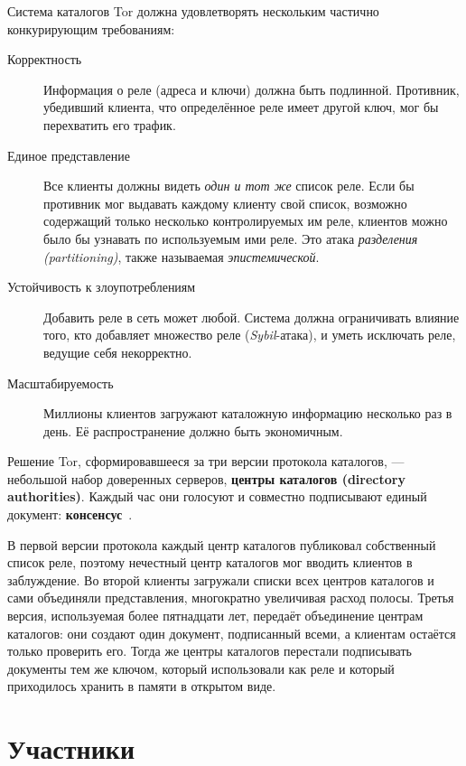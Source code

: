 Система каталогов Tor должна удовлетворять нескольким частично конкурирующим требованиям:
\begin{description}
  \item[Корректность] Информация о реле (адреса и ключи) должна быть подлинной. Противник, убедивший клиента, что определённое реле имеет другой ключ, мог бы перехватить его трафик.
  \item[Единое представление] Все клиенты должны видеть \emph{один и тот же} список реле. Если бы противник мог выдавать каждому клиенту свой список, возможно содержащий только несколько контролируемых им реле, клиентов можно было бы узнавать по используемым ими реле. Это атака \emph{разделения (partitioning)}, также называемая \emph{эпистемической}.
  \item[Устойчивость к злоупотреблениям] Добавить реле в сеть может любой. Система должна ограничивать влияние того, кто добавляет множество реле (\emph{Sybil}-атака), и уметь исключать реле, ведущие себя некорректно.
  \item[Масштабируемость] Миллионы клиентов загружают каталожную информацию несколько раз в день. Её распространение должно быть экономичным.
\end{description}

Решение Tor, сформировавшееся за три версии протокола каталогов, --- небольшой набор доверенных серверов, \textbf{центры каталогов (directory authorities)}. Каждый час они голосуют и совместно подписывают единый документ: \textbf{консенсус}~.

\begin{storia}
В первой версии протокола каждый центр каталогов публиковал собственный список реле, поэтому нечестный центр каталогов мог вводить клиентов в заблуждение. Во второй клиенты загружали списки всех центров каталогов и сами объединяли представления, многократно увеличивая расход полосы. Третья версия, используемая более пятнадцати лет, передаёт объединение центрам каталогов: они создают один документ, подписанный всеми, а клиентам остаётся только проверить его. Тогда же центры каталогов перестали подписывать документы тем же ключом, который использовали как реле и который приходилось хранить в памяти в открытом виде.
\end{storia}

\section{Участники}\label{sec:dir-attori}

